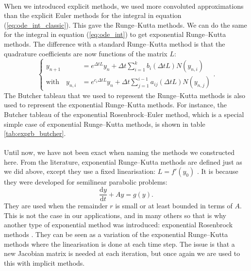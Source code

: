     \paragraph{}
    When we introduced explicit methods, we used more convoluted approximations than the explicit Euler methods for the integral in equation (\ref{eq:ode_int_classic}).
    This gave the Runge--Kutta methods.
    We can do the same for the integral in equation (\ref{eq:ode_int}) to get exponential Runge--Kutta methods.
    The difference with a standard Runge--Kutta method is that the quadrature coefficients are now functions of the matrix $L$:
    \begin{equation}
      \left\{\begin{aligned}
        y_{n+1} &= e^{\Delta t L} y_n + \Delta t \sum_{i = 1}^k b_i\left(\Delta t L\right) N\left(y_{n,i}\right) \\
        \textrm{with}\quad y_{n,i} &= e^{c_i \Delta t L} y_n + \Delta t \sum_{j = 1}^{i-1} a_{ij}\left(\Delta t L\right) N\left(y_{n,j}\right)
      \end{aligned}\right. .
    \end{equation}
    The Butcher tableau that we used to represent the Runge--Kutta methods is also used to represent the exponential Runge--Kutta methods.
    For instance, the Butcher tableau of the exponential Rosenbrock--Euler method, which is a special simple case of exponential Runge--Kutta methods, is shown in table \ref{tab:exprb_butcher}.

    \paragraph{}
    Until now, we have not been exact when naming the methods we constructed here.
    From the literature, exponential Runge--Kutta methods are defined just as we did above, except they use a fixed linearisation: $L = f'\left(y_0\right)$ \cite{HochbruckOstermann2005}.
    It is because they were developed for semilinear parabolic problems:
    \begin{equation}
      \frac{\mathrm{d} y}{\mathrm{d} t} + Ay = g\left(y\right) .
    \end{equation}
    They are used when the remainder $r$ is small or at least bounded in terms of $A$.
    This is not the case in our applications, and in many others so that is why another type of exponential method was introduced: exponential Rosenbrock methods \cite{HochbruckOstermannSchweitzer2006}.
    They can be seen as a variation of the exponential Runge--Kutta methods where the linearisation is done at each time step.
    The issue is that a new Jacobian matrix is needed at each iteration, but once again we are used to this with implicit methods.

